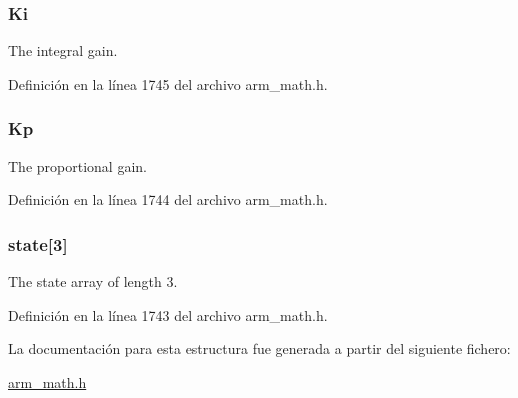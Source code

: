 \subsubsection[{\texorpdfstring{Ki}{Ki}}]{ Ki}\hypertarget{structarm__pid__instance__q15_a19d5059baf06dd52266260d096702d0a}{}\label{structarm__pid__instance__q15_a19d5059baf06dd52266260d096702d0a}
The integral gain. 

Definición en la línea 1745 del archivo arm\+\_\+math.\+h.

\subsubsection[{\texorpdfstring{Kp}{Kp}}]{ Kp}\hypertarget{structarm__pid__instance__q15_afef61fb3b64c73f2cd0c91d9dcf95679}{}\label{structarm__pid__instance__q15_afef61fb3b64c73f2cd0c91d9dcf95679}
The proportional gain. 

Definición en la línea 1744 del archivo arm\+\_\+math.\+h.

\subsubsection[{\texorpdfstring{state}{state}}]{ state\mbox{[}3\mbox{]}}\hypertarget{structarm__pid__instance__q15_a4c4e19d77015f5f7a31a1daf0faf31b6}{}\label{structarm__pid__instance__q15_a4c4e19d77015f5f7a31a1daf0faf31b6}
The state array of length 3. 

Definición en la línea 1743 del archivo arm\+\_\+math.\+h.



La documentación para esta estructura fue generada a partir del siguiente fichero\+:\begin{DoxyCompactItemize}
\item 
\hyperlink{arm__math_8h}{arm\+\_\+math.\+h}\end{DoxyCompactItemize}
